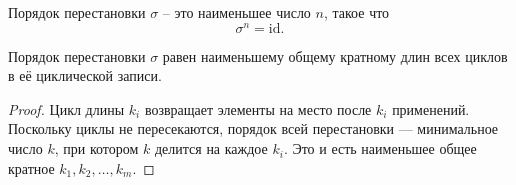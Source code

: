 \begin{definition}
    Порядок перестановки $\sigma$ -- это наименьшее число $n$, такое что \[
        \sigma^n = \text{id}.
    \]
\end{definition}

\begin{theorem}
    Порядок перестановки $\sigma$ равен наименьшему общему кратному длин всех циклов в её циклической записи.
\end{theorem}
\begin{proof}
    Цикл длины $k_i$ возвращает элементы на место после $k_i$ применений. Поскольку циклы не пересекаются, порядок всей перестановки — минимальное число $k$, при котором $k$ делится на каждое $k_i$.  
    Это и есть наименьшее общее кратное $k_1, k_2, \dots, k_m$.
\end{proof}
